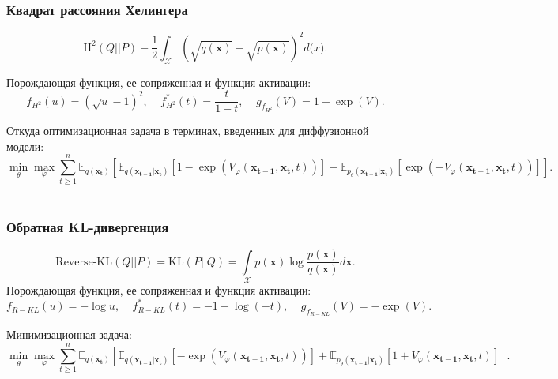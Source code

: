 \documentclass{article}
\begin{document}
\subsubsection{Квадрат рассояния Хелингера}
\begin{equation}
	\text{H}^2(Q||P) - \frac{1}{2}\int_\mathcal{X} \left(\sqrt{q(\mathbf{x})} - \sqrt{p(\mathbf{x})}\right)^2d\mathbf(x).
\end{equation}

Порождающая функция, ее сопряженная и функция активации:
\begin{equation}
	f_{H^2}(u) = (\sqrt{u} - 1)^2, ~~~~~ f^*_{H^2}(t) = \frac{t}{1 - t}, ~~~~~ g_{f_{H^2}}(V) = 1 - \exp(V).
\end{equation}

Откуда оптимизационная задача в терминах, введенных для диффузионной модели:
 \begin{equation}
	\min\limits_\theta\max\limits_\varphi\sum\limits_{t\geqslant 1}^n \mathbb{E}_{q(\mathbf{x_t})}\left[\mathbb{E}_{q(\mathbf{x_{t-1}}|\mathbf{x_t})}[1 - \exp{(V_\varphi(\mathbf{x_{t-1}}, \mathbf{x_t}, t))}] - \mathbb{E}_{p_\theta(\mathbf{x_{t-1}}|\mathbf{x_t})}[\exp{(-V_\varphi(\mathbf{x_{t-1}}, \mathbf{x_t}, t))}]\right].
\end{equation}\\

\subsubsection{Обратная KL-дивергенция}
 \begin{equation}
	\text{Reverse-KL}(Q||P) = \text{KL}(P||Q) = \int\limits_\mathcal{X} p(\mathbf{x})\log{\frac{p(\mathbf{x})}{q(\mathbf{x})}}d\mathbf{x}.
\end{equation}
Порождающая функция, ее сопряженная и функция активации:
\begin{equation}
	f_{R-KL}(u) = -\log{u}, ~~~~~ f^*_{R-KL}(t) = -1- \log({-t}),~~~~~ g_{f_{R-KL}}(V) = - \exp(V).
\end{equation}

Минимизационная задача:
\begin{equation}
	\min\limits_\theta\max\limits_\varphi\sum\limits_{t\geqslant 1}^n \mathbb{E}_{q(\mathbf{x_t})}\left[\mathbb{E}_{q(\mathbf{x_{t-1}}|\mathbf{x_t})}[-\exp{(V_\varphi(\mathbf{x_{t-1}}, \mathbf{x_t}, t))}] + \mathbb{E}_{p_\theta(\mathbf{x_{t-1}}|\mathbf{x_t})}[1 + V_\varphi(\mathbf{x_{t-1}}, \mathbf{x_t}, t)]\right].
\end{equation}\\
\end{document}
